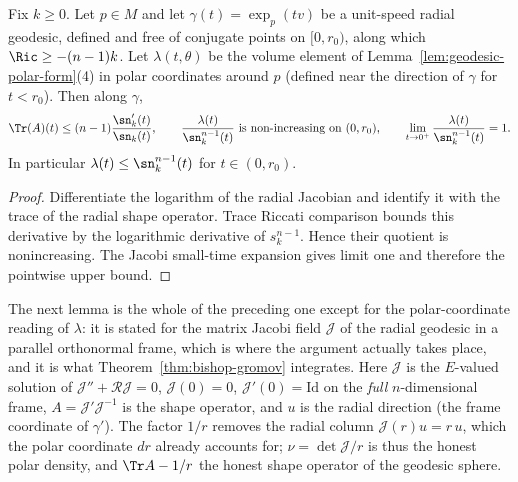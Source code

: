 \begin{lemma}
\label{lem:volume-element-comparison}

Fix $k\ge0$. Let $p\in M$ and let $\gamma(t)=\exp_p(tv)$ be a
unit-speed radial geodesic, defined and free of conjugate points on
$[0,r_0)$, along which $\Ric\ge-(n-1)k$. Let $\lambda(t,\theta)$ be
the volume element of Lemma~\ref{lem:geodesic-polar-form}(4) in
polar coordinates around $p$ (defined near the direction of
$\gamma$ for $t<r_0$). Then along $\gamma$,
$$\Tr(A)(t)\le(n-1)\frac{\sn_k'(t)}{\sn_k(t)},\qquad
\frac{\lambda(t)}{\sn_k^{n-1}(t)}\ \text{is non-increasing on
}(0,r_0),\qquad \lim_{t\to0^+}\frac{\lambda(t)}{\sn_k^{n-1}(t)}=1.$$
In particular $\lambda(t)\le\sn_k^{n-1}(t)$ for $t\in(0,r_0)$.
\end{lemma}

\begin{proof}
\sketch
{}
Differentiate the logarithm of the radial Jacobian and identify it with the trace of the radial shape operator. Trace Riccati comparison bounds this derivative by the logarithmic derivative of $s_k^{n-1}$. Hence their quotient is nonincreasing. The Jacobi small-time expansion gives limit one and therefore the pointwise upper bound.
\end{proof}

The next lemma is the whole of the preceding one except for the
polar-coordinate reading of $\lambda$: it is stated for the matrix Jacobi
field $\mathcal J$ of the radial geodesic in a parallel orthonormal frame,
which is where the argument actually takes place, and it is what
Theorem~\ref{thm:bishop-gromov} integrates. Here $\mathcal J$ is the
$E$-valued solution of $\mathcal J''+\mathcal R\mathcal J=0$,
$\mathcal J(0)=0$, $\mathcal J'(0)=\mathrm{Id}$ on the \emph{full}
$n$-dimensional frame, $A=\mathcal J'\mathcal J^{-1}$ is the shape operator,
and $u$ is the radial direction (the frame coordinate of $\gamma'$). The
factor $1/r$ removes the radial column $\mathcal J(r)u=r\,u$, which the polar
coordinate $dr$ already accounts for; $\nu=\det\mathcal J/r$ is thus the
honest polar density, and $\Tr A-1/r$ the honest shape operator of the
geodesic sphere.


